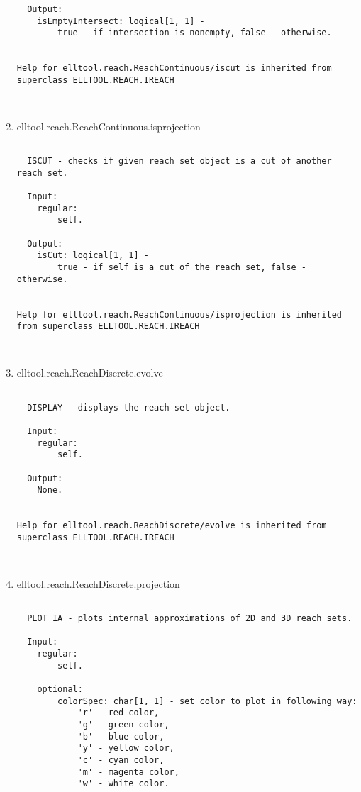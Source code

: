 \begin{enumerate}
\begin{lstlisting}
  Output:
    isEmptyIntersect: logical[1, 1] -
        true - if intersection is nonempty, false - otherwise.


Help for elltool.reach.ReachContinuous/iscut is inherited from superclass ELLTOOL.REACH.IREACH



\end{lstlisting}
\fontfamily{\familydefault}
\selectfont
\item {elltool.reach.ReachContinuous.isprojection}
\selectfont
\begin{lstlisting}

  ISCUT - checks if given reach set object is a cut of another reach set.

  Input:
    regular:
        self.

  Output:
    isCut: logical[1, 1] -
        true - if self is a cut of the reach set, false - otherwise.


Help for elltool.reach.ReachContinuous/isprojection is inherited from superclass ELLTOOL.REACH.IREACH



\end{lstlisting}
\fontfamily{\familydefault}
\selectfont
\item {elltool.reach.ReachDiscrete.evolve}
\selectfont
\begin{lstlisting}

  DISPLAY - displays the reach set object.

  Input:
    regular:
        self.

  Output:
    None.


Help for elltool.reach.ReachDiscrete/evolve is inherited from superclass ELLTOOL.REACH.IREACH



\end{lstlisting}
\fontfamily{\familydefault}
\selectfont
\item {elltool.reach.ReachDiscrete.projection}
\selectfont
\begin{lstlisting}

  PLOT_IA - plots internal approximations of 2D and 3D reach sets.

  Input:
    regular:
        self.

    optional:
        colorSpec: char[1, 1] - set color to plot in following way:
            'r' - red color,
            'g' - green color,
            'b' - blue color,
            'y' - yellow color,
            'c' - cyan color,
            'm' - magenta color,
            'w' - white color.


\end{lstlisting}
\end{enumerate}

